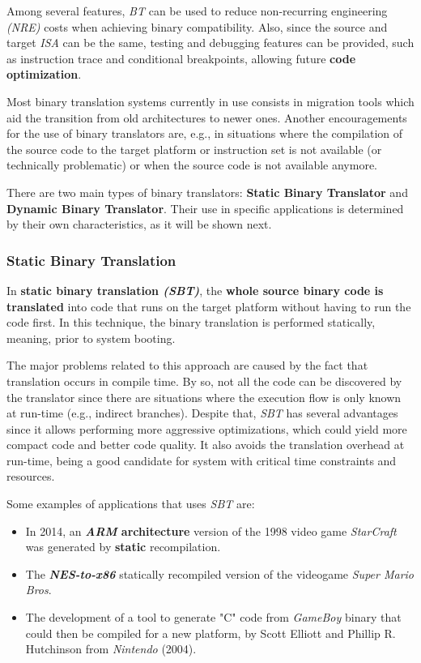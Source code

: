 Among several features, \textit{BT} can be used to reduce non-recurring engineering \textit{(NRE)} costs when achieving binary compatibility. \cite{DBT1}
Also, since the source and target \textit{ISA} can be the same, testing and debugging features can be provided, such as instruction trace and conditional breakpoints, allowing future \textbf{code optimization}. \cite{DBT1}

Most binary translation systems currently in use consists in migration tools which aid the transition from old architectures to newer ones. \cite{BinaryTranslation} Another encouragements for the use of binary translators are, e.g., in situations where the compilation of the source code to the target platform or instruction set is not available (or technically problematic) or when the source code is not available anymore. 

There are two main types of binary translators: \textbf{Static Binary Translator} and \textbf{Dynamic Binary Translator}. Their use in specific applications is determined by their own characteristics, as it will be shown next. 

\subsubsection{Static \textit{}Binary Translation}

In \textbf{static binary translation \textit{(SBT)}}, the \textbf{whole source binary code is translated} into code that runs on the target platform without having to run the code first. In this technique, the binary translation is performed statically, meaning, prior to system booting. \cite{DBT1}

The major problems related to this approach are caused by the fact that translation occurs in compile time. By so, not all the code can be discovered by the translator since there are situations where the execution flow is only known at run-time (e.g., indirect branches). Despite that, \textit{SBT} has several advantages since it allows performing more aggressive optimizations, which could yield more compact code and better code quality. It also avoids the translation overhead at run-time, being a good candidate for system with critical time constraints and resources. \cite{Shen:2014:RSB:2639036.2629335}

Some examples of applications that uses \textit{SBT} are:
\begin{itemize}
  \item In 2014, an \textbf{\textit{ARM} architecture} version of the 1998 video game \textit{StarCraft} was generated by \textbf{static} recompilation. 
  \item The \textbf{\textit{NES-to-x86}} statically recompiled version of the videogame \textit{Super Mario Bros}.
  \item The development of a tool to generate "C" code from \textit{GameBoy} binary that could then be compiled for a new platform, by Scott Elliott and Phillip R. Hutchinson from \textit{Nintendo} (2004). \cite{BinaryTranslation_example} 
\end{itemize}



